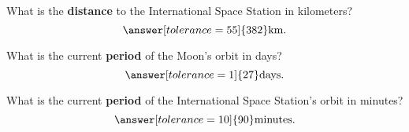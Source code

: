\documentclass{ximera}
\begin{document}
\begin{question}
  What is the \textbf{distance} to the International Space
  Station in kilometers?
  \[
  \answer[tolerance=55]{382}\mathrm{km}.
  \]
\end{question}

\begin{question}
  What is the current \textbf{period} of the Moon's orbit in days?
  \[
  \answer[tolerance=1]{27}\mathrm{days}.
  \]
\end{question}


\begin{question}
  What is the current \textbf{period} of the International Space
  Station's orbit in minutes?
  \[
  \answer[tolerance=10]{90}\mathrm{minutes}.
  \]
\end{question}
\end{document}
